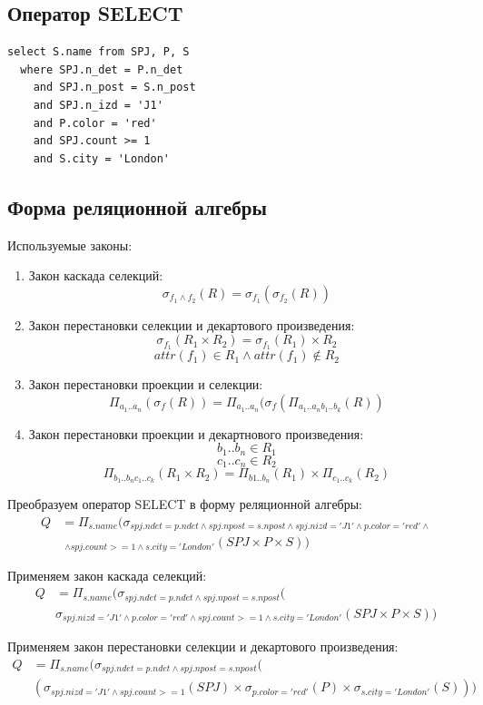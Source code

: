\documentclass[russian,utf8,emptystyle]{eskdtext}
\begin{document}
\subsection{Оператор SELECT}
\begin{verbatim}
select S.name from SPJ, P, S
  where SPJ.n_det = P.n_det
    and SPJ.n_post = S.n_post
    and SPJ.n_izd = 'J1'
    and P.color = 'red'
    and SPJ.count >= 1
    and S.city = 'London'
\end{verbatim}

\subsection{Форма реляционной алгебры}
Используемые законы:
\begin{enumerate}[label=\arabic*.]
\item Закон каскада селекций:
$$
\sigma_{f_1 \wedge f_2}(R) = \sigma_{f_1}(\sigma_{f_2}(R))
$$
\item Закон перестановки селекции и декартового произведения:
$$
\sigma_{f_1}(R_1 \times R_2) = \sigma_{f_1}(R_1) \times R_2
$$
$$
attr(f_1) \in R_1 \wedge attr(f_1) \notin R_2
$$
\item Закон перестановки проекции и селекции:
$$
\Pi_{a_1 .. a_n}(\sigma_f(R)) = \Pi_{a_1 .. a_n}(\sigma_f(\Pi_{a_1..a_nb_1..b_k}(R))
$$
\item Закон перестановки проекции и декартнового произведения:
$$
b_1 .. b_n \in R_1
$$
$$
c_1 .. c_n \in R_2
$$
$$
\Pi_{b_1 .. b_nc_1 .. c_k}(R_1 \times R_2) = \Pi_{b1 .. b_n}(R_1) \times \Pi_{c_1 .. c_k}(R_2)
$$
\end{enumerate}

Преобразуем оператор SELECT в форму реляционной алгебры:
\begin{align*}
Q &= \Pi_{s.name}(\sigma_{spj.ndet = p.ndet \wedge spj.npost = s.npost \wedge spj.nizd='J1' \wedge p.color='red' \wedge} \\
  & \;_{ \wedge spj.count>=1 \wedge s.city='London' }(SPJ \times P \times S))
\end{align*}

Применяем закон каскада селекций:
\begin{align*}
Q &= \Pi_{s.name}(\sigma_{spj.ndet = p.ndet \wedge spj.npost = s.npost}( \\
  &  \sigma_{spj.nizd='J1' \wedge p.color='red' \wedge spj.count>=1 \wedge s.city='London'}(SPJ \times P \times S))
\end{align*}

Применяем закон перестановки селекции и декартового произведения:
\begin{align*}
Q &= \Pi_{s.name}(\sigma_{spj.ndet = p.ndet \wedge spj.npost = s.npost}( \\
  & (\sigma_{spj.nizd='J1' \wedge spj.count>=1}(SPJ) \times \sigma_{p.color='red'}(P) \times \sigma_{s.city='London'}(S)))
\end{align*}
\end{document}

